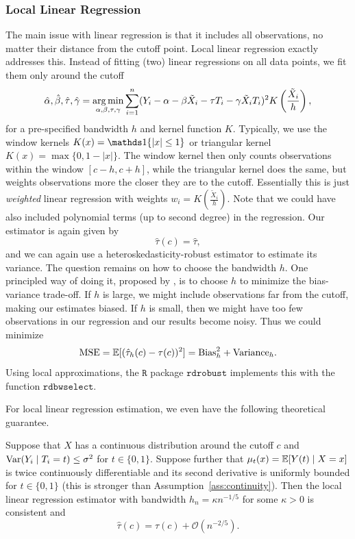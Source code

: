 \documentclass[11pt]{exam}
\begin{document}
\subsubsection{Local Linear Regression}
The main issue with linear regression is that it includes all observations, no matter their distance from the cutoff point. Local linear regression exactly addresses this. Instead of fitting (two) linear regressions on all data points, we fit them only around the cutoff
\[
    \hat \alpha, \hat \beta, \hat \tau, \hat \gamma = \operatorname*{arg\,min}_{\alpha, \beta, \tau, \gamma} \sum_{i=1}^n (Y_i - \alpha - \beta \tilde X_i - \tau T_i - \gamma \tilde X_i T_i)^2 K\left(\frac{\tilde X_i}{h}\right),
\]
for a pre-specified bandwidth $h$ and kernel function $K$. 
Typically, we use the window kernels $K(x) = \indicator{|x| \leq 1}$ or triangular kernel $K(x) = \max\{0, 1 - |x|\}$. The window kernel then only counts observations within the window $[c-h, c + h]$, while the triangular kernel does the same, but weights observations more the closer they are to the cutoff. Essentially this is just \emph{weighted} linear regression with weights $w_i = K\left(\frac{\tilde X_i}{h}\right)$. Note that we could have also included polynomial terms (up to second degree) in the regression. Our estimator is again given by 
\[
    \hat \tau(c) = \hat \tau,
\]
and we can again use a heteroskedasticity-robust estimator to estimate its variance. The question remains on how to choose the bandwidth $h$. One principled way of doing it, proposed by \citet{imbens2012optimal}, is to choose $h$ to minimize the bias-variance trade-off. If $h$ is large, we might include observations far from the cutoff, making our estimates biased. If $h$ is small, then we might have too few observations in our regression and our results become noisy. Thus we could minimize 
\begin{align*}
    \mathrm{MSE} = \mathbb{E}[(\hat \tau_h(c) - \tau (c))^2] = \mathrm{Bias}_h^2 + \mathrm{Variance}_h.
\end{align*}
Using local approximations, the $\texttt{R}$ package $\texttt{rdrobust}$ implements this with the function $\texttt{rdbwselect}$.

For local linear regression estimation, we even have the following theoretical guarantee.
\begin{theorem}
    Suppose that $X$ has a continuous distribution around the cutoff $c$ and $\mathrm{Var}(Y_i \mid T_i = t) \leq \sigma^2$ for $t \in \{0, 1\}$. Suppose further that $\mu_t(x) = \mathbb{E}[Y(t) \mid X = x]$ is twice continuously differentiable and its second derivative is uniformly bounded for $t \in \{0, 1\}$ (this is stronger than Assumption~\ref{ass:continuity}). Then the local linear regression estimator with bandwidth $h_n = \kappa n^{-1/5}$ for some $\kappa > 0$ is consistent and
    \[
        \hat \tau(c) = \tau(c) + \mathcal{O}(n^{-2/5}).
    \]
\end{theorem}
\end{document}

